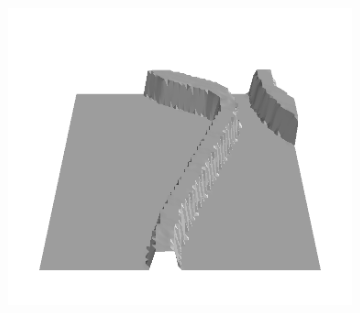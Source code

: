 \documentclass[../document.tex]{subfiles}
\begin{document}
\begin{figure}[H]
    \begin{subfigure}[b]{0.19\textwidth}
    \includegraphics[width=\linewidth]{../img/bars1-example-patches/3d/14.png}    
\end{subfigure}  
    \end{figure}
\end{document}
